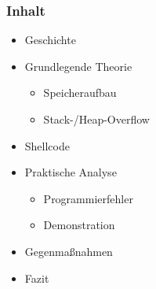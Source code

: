 \begin{frame}
    \frametitle{Inhalt}
    \begin{itemize}
        \item Geschichte
        \item Grundlegende Theorie
        \begin{itemize}
            \item Speicheraufbau
            \item Stack-/Heap-Overflow
        \end{itemize}
        \item Shellcode
        \item Praktische Analyse
        \begin{itemize}
            \item Programmierfehler
            \item Demonstration
        \end{itemize}
        \item Gegenmaßnahmen
        \item Fazit
    \end{itemize}
    
\end{frame}